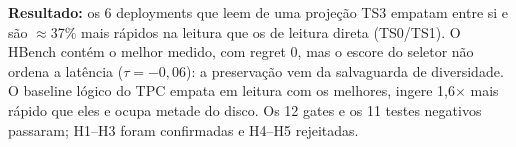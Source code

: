 \textbf{Resultado:} os 6 deployments que leem de uma projeção TS3 empatam entre si e são $\approx$37\% mais rápidos na leitura que os de leitura direta (TS0/TS1). O HBench contém o melhor medido, com regret 0, mas o escore do seletor não ordena a latência ($\tau=-0{,}06$): a preservação vem da salvaguarda de diversidade. O baseline lógico do TPC empata em leitura com os melhores, ingere 1,6$\times$ mais rápido que eles e ocupa metade do disco. Os 12 gates e os 11 testes negativos passaram; H1--H3 foram confirmadas e H4--H5 rejeitadas.
